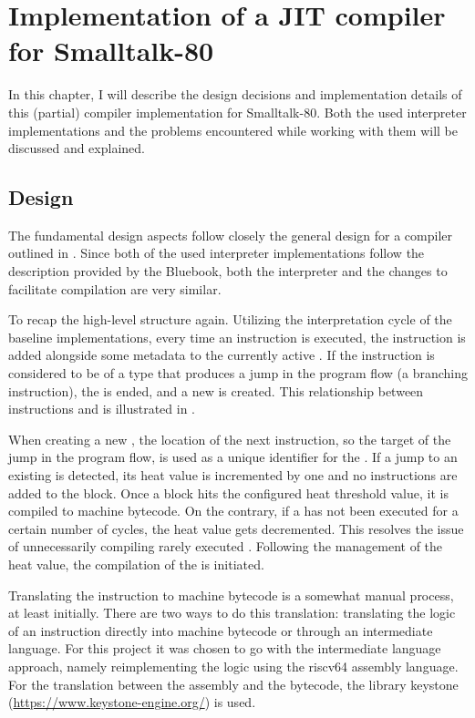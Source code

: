 \chapter{Implementation of a JIT compiler for Smalltalk-80}\label{cha:impls}
In this chapter, I will describe the design decisions and implementation details of this (partial) \jit{} compiler implementation for Smalltalk-80. 
Both the used interpreter implementations and the problems encountered while working with them will be discussed and explained.

\section{Design}
The fundamental design aspects follow closely the general design for a \jit{} compiler outlined in .
Since both of the used interpreter implementations follow the description provided by the Bluebook, both the interpreter and the changes to facilitate \jit{} compilation are very similar. 

To recap the high-level structure again. Utilizing the interpretation cycle of the baseline implementations, every time an instruction is executed, the instruction is added alongside some metadata to the currently active \bb{}. If the instruction is considered to be of a type that produces a jump in the program flow (a branching instruction), the \bb{} is ended, and a new \bb{} is created. This relationship between instructions and \bbs{} is illustrated in . 


When creating a new \bb{}, the location of the next instruction, so the target of the jump in the program flow, is used as a unique identifier for the \bb{}. 
If a jump to an existing \bb{} is detected, its heat value is incremented by one and no instructions are added to the block. 
Once a block hits the configured heat threshold value, it is compiled to machine bytecode. On the contrary, if a \bb{} has not been executed for a certain number of cycles, the heat value gets decremented. This resolves the issue of unnecessarily compiling rarely executed \bbs{}. 
Following the management of the heat value, the compilation of the \bb{} is initiated.

Translating the instruction to machine bytecode is a somewhat manual process, at least initially. There are two ways to do this translation: translating the logic of an instruction directly into machine bytecode or through an intermediate language. For this project it was chosen to go with the intermediate language approach, namely reimplementing the logic using the riscv64 assembly language. For the translation between the assembly and the bytecode, the library keystone (\url{https://www.keystone-engine.org/}) is used.

